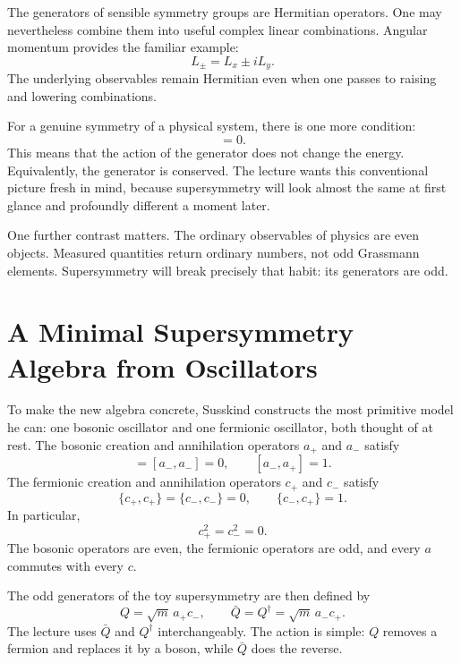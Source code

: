 The generators of sensible symmetry groups are Hermitian operators. One may nevertheless combine them into useful complex linear combinations. Angular momentum provides the familiar example:
\begin{equation}
L_\pm = L_x \pm i L_y.
\end{equation}
The underlying observables remain Hermitian even when one passes to raising and lowering combinations.

For a genuine symmetry of a physical system, there is one more condition:
\begin{equation}
[H,G_i]=0.
\end{equation}
This means that the action of the generator does not change the energy. Equivalently, the generator is conserved. The lecture wants this conventional picture fresh in mind, because supersymmetry will look almost the same at first glance and profoundly different a moment later.

One further contrast matters. The ordinary observables of physics are even objects. Measured quantities return ordinary numbers, not odd Grassmann elements. Supersymmetry will break precisely that habit: its generators are odd.

\section{A Minimal Supersymmetry Algebra from Oscillators}

To make the new algebra concrete, Susskind constructs the most primitive model he can: one bosonic oscillator and one fermionic oscillator, both thought of at rest. The bosonic creation and annihilation operators \(a_+\) and \(a_-\) satisfy
\begin{equation}
[a_+,a_+]=[a_-,a_-]=0,
\qquad
[a_-,a_+]=1.
\end{equation}
The fermionic creation and annihilation operators \(c_+\) and \(c_-\) satisfy
\begin{equation}
\{c_+,c_+\}=\{c_-,c_-\}=0,
\qquad
\{c_-,c_+\}=1.
\end{equation}
In particular,
\begin{equation}
c_+^2=c_-^2=0.
\end{equation}
The bosonic operators are even, the fermionic operators are odd, and every \(a\) commutes with every \(c\).

The odd generators of the toy supersymmetry are then defined by
\begin{equation}
Q=\sqrt{m}\,a_+c_-,
\qquad
\bar Q = Q^\dagger = \sqrt{m}\,a_-c_+.
\end{equation}
The lecture uses \(\bar Q\) and \(Q^\dagger\) interchangeably. The action is simple: \(Q\) removes a fermion and replaces it by a boson, while \(\bar Q\) does the reverse.

